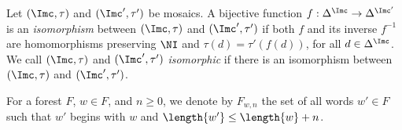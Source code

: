 \documentclass{lmcs}
\theoremstyle{definition}
\begin{document}
\smallskip
\noindent
Let $(\Imc,\tau)$ and $(\Imc',\tau')$ be mosaics. A bijective function
$f:\Delta^{\Imc}\rightarrow \Delta^{\Imc'}$ is an \emph{isomorphism}
between $(\Imc,\tau)$ and $(\Imc',\tau')$ if both $f$ and its inverse
$f^{-1}$ are homomorphisms preserving $\NI$ and $\tau(d)=\tau'(f(d))$,
for all $d\in \Delta^{\Imc}$. We call $(\Imc,\tau)$ and
$(\Imc',\tau')$ \emph{isomorphic} if there is an isomorphism
between $(\Imc,\tau)$ and $(\Imc',\tau')$.
%

For a forest $F$, $w\in F$, and $n\geq 0$, we denote by $F_{w,n}$
the set of all words $w'\in F$ such that $w'$ begins with $w$ and
$\length{w'}\leq\length{w}+n$.
\end{document}
